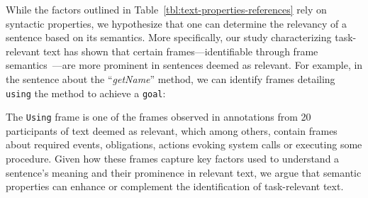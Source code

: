 



While the factors outlined in Table~\ref{tbl:text-properties-references} rely on 
syntactic properties, we hypothesize that one can determine the relevancy of a sentence based on its semantics. 
More specifically, our study characterizing task-relevant text has shown that certain frames---identifiable through frame semantics~\cite{fillmore1976frame}---are more prominent in sentences deemed as relevant.
For example, in the sentence about the ``\textit{getName}'' method,
we can identify frames detailing \texttt{using} the method to achieve a \texttt{goal}:




The \texttt{Using} frame is one of the frames observed in annotations from 20 participants of text deemed as relevant,
 which among others, contain frames about required events, obligations, actions evoking system calls or executing some procedure.
Given how these frames capture key factors used to understand a sentence's meaning
and their prominence in relevant text, 
we argue that semantic properties can enhance or complement the identification of task-relevant text.





